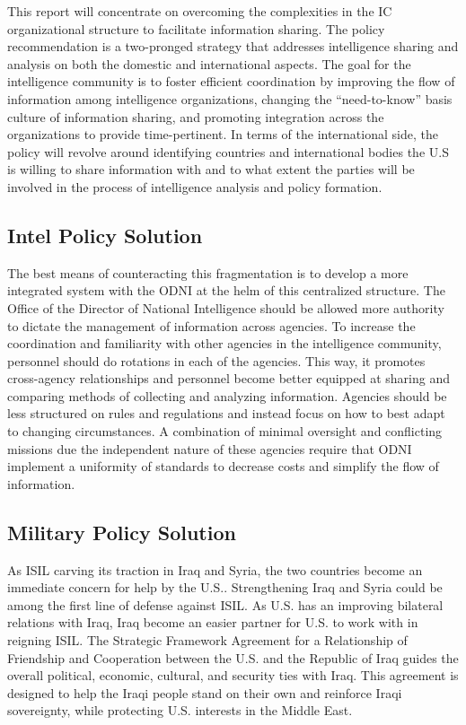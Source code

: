 \documentclass{report}
\begin{document}
This report will concentrate on overcoming the complexities in the IC organizational structure to facilitate information sharing. The policy recommendation is a two-pronged strategy that addresses intelligence sharing and analysis on both the domestic and international aspects. The goal for the intelligence community is to foster efficient coordination by improving the flow of information among intelligence organizations, changing the \enquote{need-to-know} basis culture of information sharing, and promoting integration across the organizations to provide time-pertinent. In terms of the international side, the policy will revolve around identifying countries and international bodies the U.S is willing to share information with and to what extent the parties will be involved in the process of intelligence analysis and policy formation.

\subsection{Intel Policy Solution}

The best means of counteracting this fragmentation is to develop a more integrated system with the ODNI at the helm of this  centralized structure. The Office of the Director of National Intelligence should be allowed more authority to dictate the management of information across agencies.  To increase the coordination and familiarity with other agencies in the intelligence community, personnel should do rotations in each of the agencies. This way, it promotes cross-agency relationships and personnel become better equipped at sharing and comparing methods of collecting and analyzing information.  Agencies should be less structured on rules and regulations and instead focus on how to best adapt to changing circumstances. A combination of minimal oversight and conflicting missions due the independent nature of these agencies \cite{Zegart2005} require that ODNI implement a uniformity of standards to decrease costs and simplify the flow of information. 

\subsection{Military Policy Solution}
 
As ISIL carving its traction in Iraq and Syria, the two countries become an immediate concern for help by the U.S.. Strengthening Iraq and Syria could be among the first line of defense against ISIL. As U.S. has an improving bilateral relations with Iraq, Iraq become an easier partner for U.S. to work with in reigning ISIL. The Strategic Framework Agreement for a Relationship of Friendship and Cooperation between the U.S. and the Republic of Iraq guides the overall political, economic, cultural, and security ties with Iraq.  This agreement is designed to help the Iraqi people stand on their own and reinforce Iraqi sovereignty, while protecting U.S. interests in the Middle East. 
\end{document}
